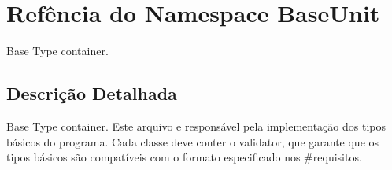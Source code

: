 \hypertarget{namespaceBaseUnit}{\section{Refência do Namespace Base\-Unit}
\label{namespaceBaseUnit}
}


Base Type container.  




\subsection{Descrição Detalhada}
Base Type container. Este arquivo e responsável pela implementação dos tipos básicos do programa. Cada classe deve conter o validator, que garante que os tipos básicos são compatíveis com o formato especificado nos \#requisitos. 